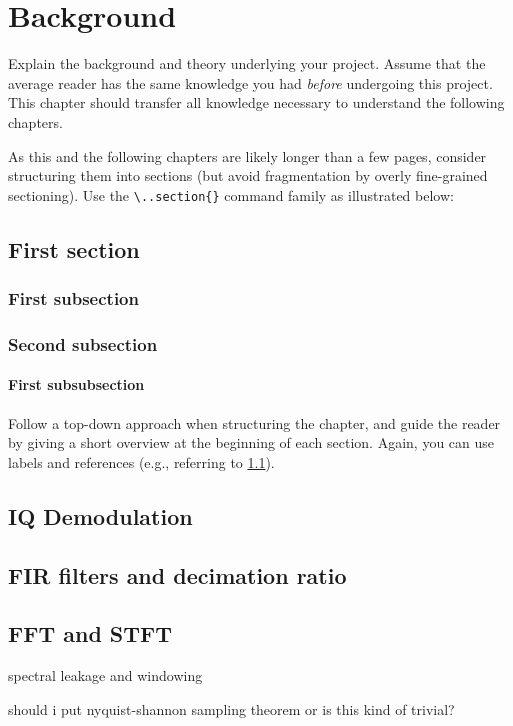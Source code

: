 \chapter{Background}
\label{ch:background}

Explain the background and theory underlying your project.
Assume that the average reader has the same knowledge you had \emph{before} undergoing this project.
This chapter should transfer all knowledge necessary to understand the following chapters.

As this and the following chapters are likely longer than a few pages, consider structuring them into sections (but avoid fragmentation by overly fine-grained sectioning).
Use the \verb|\..section{}| command family as illustrated below:

\section{First section}
\label{sec:background_overview}

\subsection{First subsection}

\subsection{Second subsection}

\subsubsection{First subsubsection}

Follow a top-down approach when structuring the chapter, and guide the reader by giving a short overview at the beginning of each section.
Again, you can use labels and references (e.g., referring to \cref{sec:background_overview}).


\section{IQ Demodulation}

\section{FIR filters and decimation ratio}

\section{FFT and STFT}
spectral leakage and windowing

should i put nyquist-shannon sampling theorem or is this kind of trivial?
